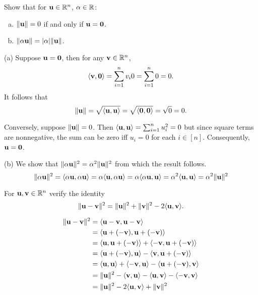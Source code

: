 \documentclass[letterpaper, twoside, 12pt]{book}
\begin{document}
\begin{exercise}[3]
  Show that for \(\mathbf u\in\mathbb R^n\), \(\alpha\in\mathbb R\):
  \begin{enumerate}[(a)]
    \item \(\|\mathbf u\|=0\) if and only if \(\mathbf u=\mathbf 0\).
    \item \(\|\alpha\mathbf u\|=|\alpha|\|\mathbf u\|\).
  \end{enumerate}
\end{exercise}

\begin{solution}
    (a) Suppose \(\mathbf u = \mathbf 0\), then for any \(\mathbf v \in \mathbb R^n\),
    \[ \langle\mathbf v, \mathbf 0\rangle = \sum_{i = 1}^n v_i 0 = \sum_{i = 1}^n 0 = 0 .\]
    It follows that 
    \[ \|\mathbf u\| = \sqrt{\langle\mathbf u, \mathbf u \rangle} = \sqrt{\langle\mathbf 0, \mathbf 0\rangle} = \sqrt{0} = 0 .\]

    Conversely, suppose \(\|\mathbf u\| = 0\). Then \(\langle\mathbf u, \mathbf u\rangle = \sum_{i = 1}^n u_i^2 = 0 \)
    but since square terms are nonnegative, the sum can be zero iff \(u_i = 0\) for each
    \(i \in [n]\). Consequently, \(\mathbf u = \mathbf 0\).

    (b) We show that \( \|\alpha \mathbf u\|^2 = \alpha^2 \|\mathbf u\|^2\) from which the result
    follows.
    \[ \|\alpha \mathbf u\|^2 = \langle \alpha \mathbf u, \alpha \mathbf u\rangle 
        = \alpha \langle\mathbf u, \alpha \mathbf u\rangle 
        = \alpha \langle \alpha \mathbf u, \mathbf u \rangle
        = \alpha^2 \langle \mathbf u, \mathbf u \rangle
    = \alpha^2 \|\mathbf u\|^2 \]
\end{solution}

\begin{exercise}[4]
  For \(\mathbf u,\mathbf v\in\mathbb R^n\) verify the identity
  \[
    \|\mathbf u-\mathbf v\|^2
      =
    \|\mathbf u\|^2+\|\mathbf v\|^2-2\langle\mathbf u,\mathbf v\rangle
  .\]
\end{exercise}

\begin{solution}
    \begin{align*}
        \|\mathbf u - \mathbf v \|^2 &= \langle\mathbf u - \mathbf v, \mathbf u - \mathbf v\rangle \\
                    &= \langle\mathbf u + (-\mathbf v), \mathbf u + (-\mathbf v)\rangle \\
                    &= \langle\mathbf u, \mathbf u + (-\mathbf v)\rangle + \langle-\mathbf v, \mathbf u + (-\mathbf v)\rangle \\
                    &= \langle\mathbf u + (-\mathbf v), \mathbf u\rangle - \langle \mathbf v, \mathbf u + (-\mathbf v) \rangle \\
                    &= \langle\mathbf u, \mathbf u\rangle + \langle -\mathbf v, \mathbf u\rangle - \langle\mathbf u + (-\mathbf v), \mathbf v \rangle \\
                    &= \|\mathbf u\|^2 - \langle\mathbf v, \mathbf u\rangle - \langle\mathbf u, \mathbf v\rangle - \langle-\mathbf v, \mathbf v \rangle\\
                    &= \|\mathbf u\|^2 - 2\langle\mathbf u, \mathbf v\rangle + \|\mathbf v\|^2 \\
    \end{align*}
\end{solution}
\end{document}
